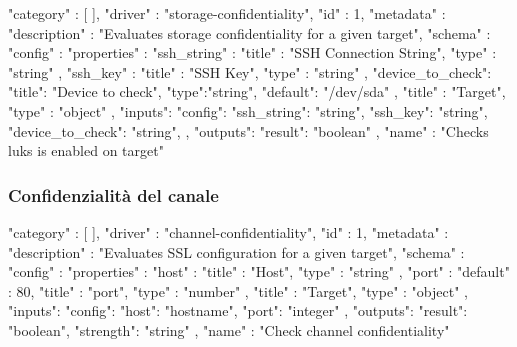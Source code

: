 \documentclass[../main.tex]{subfiles}
\begin{document}
\begin{js}
{
  "category" : [  ],
  "driver" : "storage-confidentiality",
  "id" : 1,
  "metadata" : {
      "description" : "Evaluates storage confidentiality for a given target",
      "schema" : {
          "config" : {
              "properties" : {
                  "ssh_string" : {
                      "title" : "SSH Connection String",
                      "type" : "string"
                    },
                  "ssh_key" : {
                      "title" : "SSH Key",
                      "type" : "string"
                    },
                    "device_to_check": {
                        "title": "Device to check",
                        "type":"string",
                        "default": "/dev/sda"
                    }
                },
              "title" : "Target",
              "type" : "object"
            }
        },
        "inputs": {
            "config": {
                "ssh_string": "string",
                "ssh_key": "string",
                "device_to_check": "string",
            }
        },
        "outputs": {
            "result": "boolean"
        }
    },
  "name" : "Checks luks is enabled on target"
}
\end{js}

\subsubsection{Confidenzialità del canale}

\begin{js}
{
  "category" : [  ],
  "driver" : "channel-confidentiality",
  "id" : 1,
  "metadata" : {
      "description" : "Evaluates SSL configuration for a given target",
      "schema" : {
          "config" : {
              "properties" : {
                  "host" : {
                      "title" : "Host",
                      "type" : "string"
                    },
                  "port" : {
                      "default" : 80,
                      "title" : "port",
                      "type" : "number"
                    }
                },
              "title" : "Target",
              "type" : "object"
            }
        },
        "inputs": {
            "config": {
                "host": "hostname",
                "port": "integer"
            }
        },
        "outputs": {
            "result": "boolean",
            "strength": "string"
        }
    },
  "name" : "Check channel confidentiality"
}
\end{js}
\end{document}

